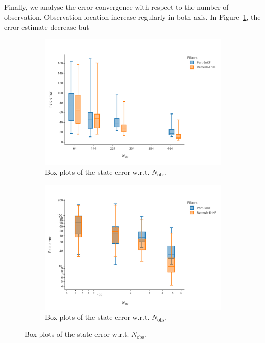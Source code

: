 Finally, we analyse the error convergence with respect to the number of observation. Observation location increase regularly in both axis. In Figure~\ref{fig:nobs_1}, the error estimate decrease but

\begin{figure}[h!]
	\centering
	\begin{subfigure}{0.49\linewidth}
		\centering
		\includegraphics[width=\linewidth]{./images/app2d/final/MSE_nobs_box.pdf}
		\caption{Box plots of the state error w.r.t. $N_{\text{obs}}$.}
		\label{fig:nobs_1}
	\end{subfigure}
	\begin{subfigure}{0.49\linewidth}
		\centering
		\includegraphics[width=\linewidth]{./images/app2d/final/MSE_nobs_box_log_log.pdf}
		\caption{Box plots of the state error w.r.t. $N_{\text{obs}}$.}
		\label{fig:nobs_2}
	\end{subfigure}
	\label{fig:nobs}

	\label{fig:assim_params}
\end{figure}

